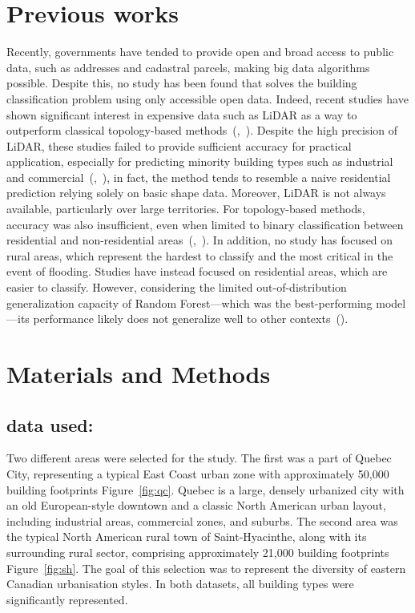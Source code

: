 \documentclass[11pt]{article}
\begin{document}
\section{Previous works}
Recently, governments have tended to provide open and broad access to public data, such as addresses and cadastral parcels, making big data algorithms possible. Despite this, no study has been found that solves the building classification problem using only accessible open data. Indeed, recent studies have shown significant interest in expensive data such as LiDAR as a way to outperform classical topology-based methods~(\cite{wurm2015},~\cite{lloyd2020}). Despite the high precision of LiDAR, these studies failed to provide sufficient accuracy for practical application, especially for predicting minority building types such as industrial and commercial~(\cite{belgiu2014},~\cite{evans2017}), in fact, the method tends to resemble a naive residential prediction relying solely on basic shape data. Moreover, LiDAR is not always available, particularly over large territories. For topology-based methods, accuracy was also insufficient, even when limited to binary classification between residential and non-residential areas~(\cite{wurm2015},~\cite{lloyd2020}). In addition, no study has focused on rural areas, which represent the hardest to classify and the most critical in the event of flooding. Studies have instead focused on residential areas, which are easier to classify. However, considering the limited out-of-distribution generalization capacity of Random Forest—which was the best-performing model—its performance likely does not generalize well to other contexts~(\cite{shimodaira2000covariate}).


\section{Materials and Methods}
\subsection[\appendixname~\thesubsection]{data used:}
Two different areas were selected for the study. The first was a part of Quebec City, representing a typical East Coast urban zone with approximately 50,000 building footprints Figure~\ref{fig:qc}. Quebec is a large, densely urbanized city with an old European-style downtown and a classic North American urban layout, including industrial areas, commercial zones, and suburbs. The second area was the typical North American rural town of Saint-Hyacinthe, along with its surrounding rural sector, comprising approximately 21,000 building footprints Figure~\ref{fig:sh}. The goal of this selection was to represent the diversity of eastern Canadian urbanisation styles. In both datasets, all building types were significantly represented.
\end{document}
